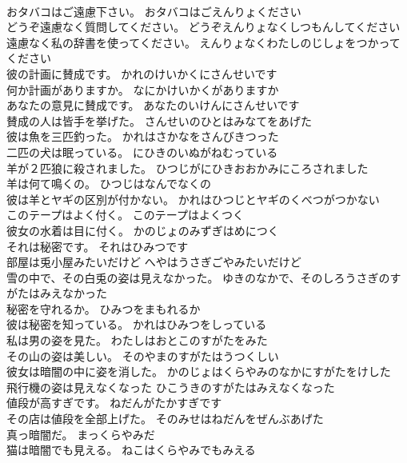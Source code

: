 \documentclass[8pt]{extreport}
\begin{document}
\begin{CJK}{UTF8}{min}
\\	おタバコはご遠慮下さい。	おタバコはごえんりょください 
\\	どうぞ遠慮なく質問してください。	どうぞえんりょなくしつもんしてください 
\\	遠慮なく私の辞書を使ってください。	えんりょなくわたしのじしょをつかってください 
\\	彼の計画に賛成です。	かれのけいかくにさんせいです 
\\	何か計画がありますか。	なにかけいかくがありますか 
\\	あなたの意見に賛成です。	あなたのいけんにさんせいです 
\\	賛成の人は皆手を挙げた。	さんせいのひとはみなてをあげた 
\\	彼は魚を三匹釣った。	かれはさかなをさんびきつった 
\\	二匹の犬は眠っている。	にひきのいぬがねむっている 
\\	羊が２匹狼に殺されました。	ひつじがにひきおおかみにころされました 
\\	羊は何て鳴くの。	ひつじはなんでなくの 
\\	彼は羊とヤギの区別が付かない。	かれはひつじとヤギのくべつがつかない 
\\	このテープはよく付く。	このテープはよくつく 
\\	彼女の水着は目に付く。	かのじょのみずぎはめにつく 
\\	それは秘密です。	それはひみつです 
\\	部屋は兎小屋みたいだけど	へやはうさぎごやみたいだけど 
\\	雪の中で、その白兎の姿は見えなかった。	ゆきのなかで、そのしろうさぎのすがたはみえなかった 
\\	秘密を守れるか。	ひみつをまもれるか 
\\	彼は秘密を知っている。	かれはひみつをしっている 
\\	私は男の姿を見た。	わたしはおとこのすがたをみた 
\\	その山の姿は美しい。	そのやまのすがたはうつくしい 
\\	彼女は暗闇の中に姿を消した。	かのじょはくらやみのなかにすがたをけした 
\\	飛行機の姿は見えなくなった	ひこうきのすがたはみえなくなった 
\\	値段が高すぎです。	ねだんがたかすぎです 
\\	その店は値段を全部上げた。	そのみせはねだんをぜんぶあげた 
\\	真っ暗闇だ。	まっくらやみだ 
\\	猫は暗闇でも見える。	ねこはくらやみでもみえる 

\end{CJK}
\end{document}
